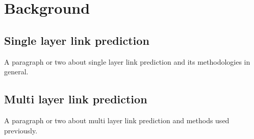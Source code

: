 \section{Background}
\label{sec:background}

\subsection{Single layer link prediction}
\label{sec:slp}

A paragraph or two about single layer link prediction and its methodologies in
general. 

\subsection{Multi layer link prediction}

A paragraph or two about multi layer link prediction and methods used previously.

